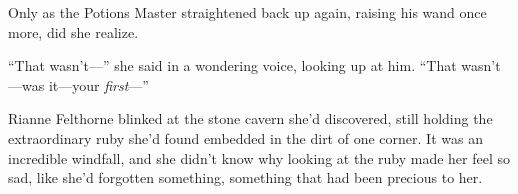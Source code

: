 Only as the Potions Master straightened back up again, raising his wand once more, did she realize.

“That wasn’t—” she said in a wondering voice, looking up at him. “That wasn’t—was it—your \emph{first}—”

Rianne Felthorne blinked at the stone cavern she’d discovered, still holding the extraordinary ruby she’d found embedded in the dirt of one corner. It was an incredible windfall, and she didn’t know why looking at the ruby made her feel so sad, like she’d forgotten something, something that had been precious to her.

